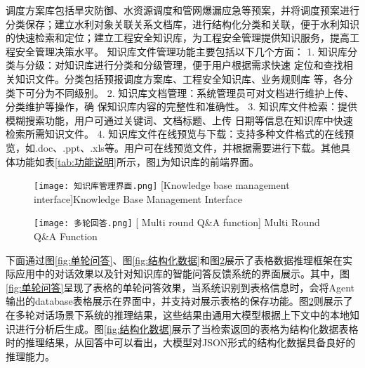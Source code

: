 调度方案库包括旱灾防御、水资源调度和管网爆漏应急等预案，并将调度预案进行分类保存；建立水利对象关联关系文档库，进行结构化分类和关联，便于水利知识的快速检索和定位；建立工程安全知识库，为工程安全管理提供知识服务，提高工程安全管理决策水平。
知识库文件管理功能主要包括以下几个方面：
1. 知识库分类与分级：对知识库进行分类和分级管理，便于用户根据需求快速
定位和查找相关知识文件。分类包括预报调度方案库、工程安全知识库、业务规则库
等，各分类下可分为不同级别。
2. 知识库文档管理：系统管理员可对文档进行维护上传、分类维护等操作，确
保知识库内容的完整性和准确性。
3. 知识库文件检索：提供模糊搜索功能，用户可通过关键词、文档标题、上传
日期等信息在知识库中快速检索所需知识文件。
4. 知识库文件在线预览与下载：支持多种文件格式的在线预览，如.doc、.ppt、.xls等。用户可在线预览文件，并根据需要进行下载。其他具体功能如表\ref{tab:功能说明}所示，图\ref{fig:知识库管理}为知识库的前端界面。
\begin{figure}[htbp]
    \centering
    \texttt{[image: 知识库管理界面.png]}
    [Knowledge base management interface]{Knowledge Base Management Interface}
    \label{fig:知识库管理}
\end{figure}
\begin{figure}[!htbp]
    \centering
    \texttt{[image: 多轮回答.png]}
    [ Multi round Q\&A function]{ Multi Round Q\&A Function}
    \label{fig:多轮对话展示}
\end{figure}

下面通过图\ref{fig:单轮问答}、图\ref{fig:结构化数据}和图\ref{fig:多轮对话展示}展示了表格数据推理框架在实际应用中的对话效果以及针对知识库的智能问答反馈系统的界面展示。其中，图\ref{fig:单轮问答}呈现了表格的单轮问答效果，当系统识别到表格信息时，会将Agent输出的database表格展示在界面中，并支持对展示表格的保存功能。图\ref{fig:多轮对话展示}则展示了在多轮对话场景下系统的推理结果，这些结果由通用大模型根据上下文中的本地知识进行分析后生成。图\ref{fig:结构化数据}展示了当检索返回的表格为结构化数据表格时的推理结果，从回答中可以看出，大模型对JSON形式的结构化数据具备良好的推理能力。

